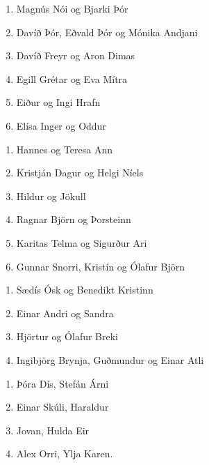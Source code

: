 \begin{multicols}{2}
\begin{enumerate}[label = \textbf{Mán \arabic*:}]
    \item Magnús Nói og Bjarki Þór
    \item Davíð Þór, Eðvald Þór og Mónika Andjani
    \item Davíð Freyr og Aron Dimas
    \item Egill Grétar og Eva Mítra
    \item Eiður og Ingi Hrafn
    \item Elísa Inger og Oddur \columnbreak
\end{enumerate}

\begin{enumerate}[label = \textbf{Fös \arabic*:}]
    \item Hannes og Teresa Ann
    \item Kristján Dagur og Helgi Níels
    \item Hildur og Jökull
    \item Ragnar Björn og Þorsteinn
    \item Karitas Telma og Sigurður Ari
    \item Gunnar Snorri, Kristín og Ólafur Björn
\end{enumerate}
\end{multicols}

\vspace{0.5cm}

\begin{multicols}{2}
\begin{enumerate}[label = \textbf{Þri \arabic*:}]
    \item Sædís Ósk og Benedikt Kristinn
    \item Einar Andri og Sandra
    \item Hjörtur og Ólafur Breki
    \item Ingibjörg Brynja, Guðmundur og Einar Atli \columnbreak
\end{enumerate}

\begin{enumerate}[label = \textbf{Fim \arabic*:}]
    \item Þóra Dís, Stefán Árni
    \item Einar Skúli, Haraldur
    \item Jovan, Hulda Eir
    \item Alex Orri, Ylja Karen.
\end{enumerate}
\end{multicols}

